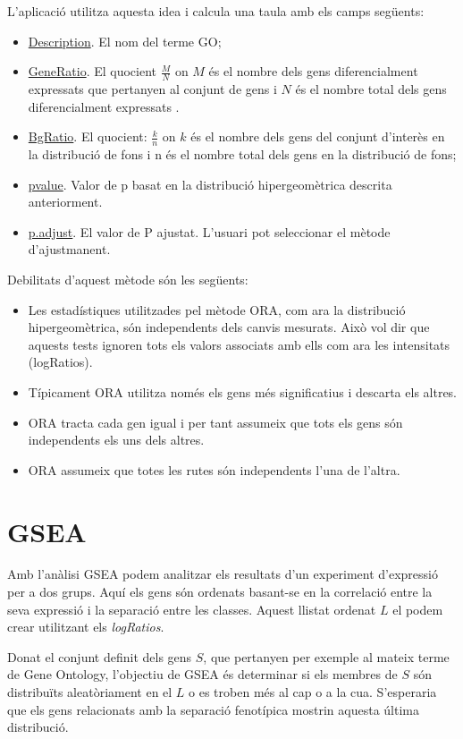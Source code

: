L'aplicació utilitza aquesta idea i calcula una taula amb els camps següents:


\begin{itemize}
\item \underline{Description}. El nom del terme \gls{GO};
\item \underline{GeneRatio}. El quocient $\frac{M}{N}$ on $M$ és el nombre dels gens diferencialment expressats que pertanyen al conjunt de gens i $N$ és el nombre total dels gens diferencialment expressats .
\item \underline{BgRatio}. El quocient: $\frac{k}{n}$ on $k$ és el nombre dels gens del conjunt d'interès en la distribució de fons i n és el nombre total dels gens en la distribució de fons;
\item \underline{pvalue}. Valor de p basat en la distribució hipergeomètrica descrita anteriorment.
\item \underline{p.adjust}. El valor de P ajustat. L'usuari pot seleccionar el mètode d'ajustmanent.
\end{itemize}

Debilitats d'aquest mètode són les següents:
\begin{itemize}
\item Les estadístiques utilitzades pel mètode ORA, com ara la distribució hipergeomètrica, són independents dels canvis mesurats. Això vol dir que aquests tests ignoren tots els valors associats amb ells com ara les intensitats (logRatios).
\item Típicament ORA utilitza només els gens més significatius i descarta els altres.
\item ORA tracta cada gen igual i per tant assumeix que tots els gens són independents els uns dels altres.
\item ORA assumeix que totes les rutes són independents l’una de l’altra.
\end{itemize}


\section{\gls{GSEA}}

Amb l'anàlisi \gls{GSEA} podem analitzar els resultats d'un experiment d'expressió per a dos grups. Aquí els gens són ordenats basant-se en la correlació entre la seva expressió i la separació entre les classes. Aquest llistat ordenat $L$ el podem crear utilitzant els \textit{\gls{logRatio}s}.

Donat el conjunt definit dels gens $S$, que pertanyen per exemple al mateix terme de Gene Ontology, l'objectiu de GSEA és determinar si els membres de $S$ són distribuïts aleatòriament en el $L$ o es troben més al cap o a la cua. S'esperaria que els gens relacionats amb la separació fenotípica mostrin aquesta última distribució. 

